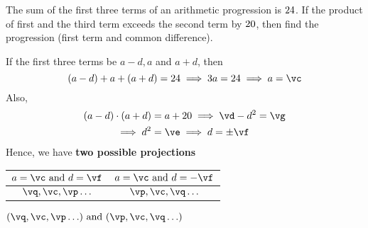 


\DIVIDE{}\vc
\SQUARE\vc\vd
\EXPR[0]\ve{\vd-\vc-\vb}
\SQUAREROOT\ve\vf
\ADD\vc\vb\vg

\ADD\vc\vf\vp
\SUBTRACT\vc\vf\vq

\question The sum of the first three terms of an arithmetic progression is $24$. 
If the product of first and the third term exceeds the second term by $20$, 
then find the progression (first term and common difference).

\watchout

\begin{solution}
  If the first three terms be $a-d,a$ and $a+d$, then 
  \[ (a-d) + a + (a+d) = \va\implies 3a = \va \implies a = \vc \]
  Also,
  \begin{align}
    (a-d)\cdot (a+d) &= a + \vb\implies\vd-d^2 = \vg \\
    \implies d^2 &= \ve\implies d = \pm\vf
  \end{align}
  Hence, we have \textbf{two possible projections}

  \begin{tabular}{c c}
    \toprule
      $a=\vc\text{ and }d=\vf$ & $a=\vc\text{ and }d=-\vf$  \\
    \midrule
      $\vq,\vc,\vp\ldots$ & $\vp,\vc,\vq\ldots$ \\ 
    \bottomrule
  \end{tabular}
\end{solution}

\ifprintanswers
  \begin{codex}
    $(\vq,\vc,\vp\ldots)\text{ and }(\vp,\vc,\vq\ldots)$
  \end{codex}
\fi
